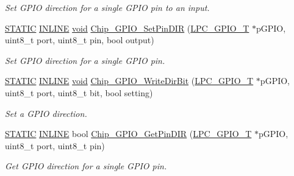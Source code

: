 \begin{DoxyCompactItemize}
\begin{DoxyCompactList}\small\item\em Set G\-P\-I\-O direction for a single G\-P\-I\-O pin to an input. \end{DoxyCompactList}\item 
\hyperlink{group__LPC__Types__Public__Macros_ga10b2d890d871e1489bb02b7e70d9bdfb}{S\-T\-A\-T\-I\-C} \hyperlink{group__LPC__Types__Public__Types_ga2eb6f9e0395b47b8d5e3eeae4fe0c116}{I\-N\-L\-I\-N\-E} \hyperlink{Paradigm_2Tern__EE_2small_2portmacro_8h_a14d32f8130d3c0b212cfc751730b5b49}{void} \hyperlink{group__GPIO__17XX__40XX_gac384ba462a45291528e95945c3273772}{Chip\-\_\-\-G\-P\-I\-O\-\_\-\-Set\-Pin\-D\-I\-R} (\hyperlink{structLPC__GPIO__T}{L\-P\-C\-\_\-\-G\-P\-I\-O\-\_\-\-T} $\ast$p\-G\-P\-I\-O, uint8\-\_\-t port, uint8\-\_\-t pin, bool output)
\begin{DoxyCompactList}\small\item\em Set G\-P\-I\-O direction for a single G\-P\-I\-O pin. \end{DoxyCompactList}\item 
\hyperlink{group__LPC__Types__Public__Macros_ga10b2d890d871e1489bb02b7e70d9bdfb}{S\-T\-A\-T\-I\-C} \hyperlink{group__LPC__Types__Public__Types_ga2eb6f9e0395b47b8d5e3eeae4fe0c116}{I\-N\-L\-I\-N\-E} \hyperlink{Paradigm_2Tern__EE_2small_2portmacro_8h_a14d32f8130d3c0b212cfc751730b5b49}{void} \hyperlink{group__GPIO__17XX__40XX_ga4b726d64407e21f40d4fc23f16da04ab}{Chip\-\_\-\-G\-P\-I\-O\-\_\-\-Write\-Dir\-Bit} (\hyperlink{structLPC__GPIO__T}{L\-P\-C\-\_\-\-G\-P\-I\-O\-\_\-\-T} $\ast$p\-G\-P\-I\-O, uint8\-\_\-t port, uint8\-\_\-t bit, bool setting)
\begin{DoxyCompactList}\small\item\em Set a G\-P\-I\-O direction. \end{DoxyCompactList}\item 
\hyperlink{group__LPC__Types__Public__Macros_ga10b2d890d871e1489bb02b7e70d9bdfb}{S\-T\-A\-T\-I\-C} \hyperlink{group__LPC__Types__Public__Types_ga2eb6f9e0395b47b8d5e3eeae4fe0c116}{I\-N\-L\-I\-N\-E} bool \hyperlink{group__GPIO__17XX__40XX_ga5f36fe1a2c2b2eb958133c27cb65bee5}{Chip\-\_\-\-G\-P\-I\-O\-\_\-\-Get\-Pin\-D\-I\-R} (\hyperlink{structLPC__GPIO__T}{L\-P\-C\-\_\-\-G\-P\-I\-O\-\_\-\-T} $\ast$p\-G\-P\-I\-O, uint8\-\_\-t port, uint8\-\_\-t pin)
\begin{DoxyCompactList}\small\item\em Get G\-P\-I\-O direction for a single G\-P\-I\-O pin. \end{DoxyCompactList}\item 

\end{DoxyCompactItemize}
